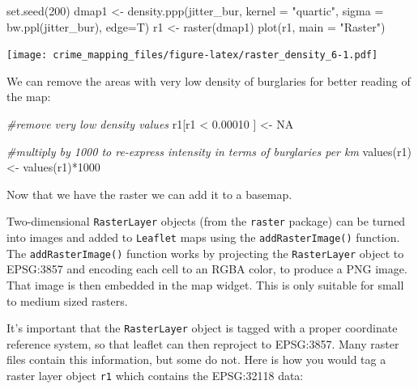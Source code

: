 \documentclass[
  krantz2]{krantz}
\makeatletter
\newenvironment{Shaded}{\begin{snugshade}}{\end{snugshade}}
\newcommand{\AttributeTok}[1]{\textcolor[rgb]{0.61,0.61,0.61}{#1}}
\newcommand{\CommentTok}[1]{\textcolor[rgb]{0.37,0.37,0.37}{\textit{#1}}}
\newcommand{\ConstantTok}[1]{\textcolor[rgb]{0,0,0}{#1}}
\newcommand{\DecValTok}[1]{\textcolor[rgb]{0.06,0.06,0.06}{#1}}
\newcommand{\FloatTok}[1]{\textcolor[rgb]{0.06,0.06,0.06}{#1}}
\newcommand{\FunctionTok}[1]{\textcolor[rgb]{0,0,0}{#1}}
\newcommand{\NormalTok}[1]{#1}
\newcommand{\OtherTok}[1]{\textcolor[rgb]{0.37,0.37,0.37}{#1}}
\newcommand{\SpecialCharTok}[1]{\textcolor[rgb]{0,0,0}{#1}}
\newcommand{\StringTok}[1]{\textcolor[rgb]{0.5,0.5,0.5}{#1}}
\newenvironment{kframe}{%
\medskip{}
\setlength{\fboxsep}{.8em}
 \def\at@end@of@kframe{}%
 \ifinner\ifhmode%
  \def\at@end@of@kframe{\end{minipage}}%
  \begin{minipage}{\columnwidth}%
 \fi\fi%
 \def\FrameCommand##1{\hskip\@totalleftmargin \hskip-\fboxsep
 \colorbox{shadecolor}{##1}\hskip-\fboxsep
     \hskip-\linewidth \hskip-\@totalleftmargin \hskip\columnwidth}%
 \MakeFramed {\advance\hsize-\width
   \@totalleftmargin\z@ \linewidth\hsize
   \@setminipage}}%
 {\par\unskip\endMakeFramed%
 \at@end@of@kframe}
\renewenvironment{Shaded}{\begin{kframe}}{\end{kframe}}
\makeatother
\begin{document}
\begin{Shaded}
\begin{Highlighting}[]
\FunctionTok{set.seed}\NormalTok{(}\DecValTok{200}\NormalTok{)}
\NormalTok{dmap1 }\OtherTok{\textless{}{-}} \FunctionTok{density.ppp}\NormalTok{(jitter\_bur, }\AttributeTok{kernel =} \StringTok{"quartic"}\NormalTok{,}
                     \AttributeTok{sigma =} \FunctionTok{bw.ppl}\NormalTok{(jitter\_bur), }
                     \AttributeTok{edge=}\NormalTok{T)}
\NormalTok{r1 }\OtherTok{\textless{}{-}} \FunctionTok{raster}\NormalTok{(dmap1)}
\FunctionTok{plot}\NormalTok{(r1, }\AttributeTok{main =} \StringTok{"Raster"}\NormalTok{)}
\end{Highlighting}
\end{Shaded}

\texttt{[image: crime\_mapping\_files/figure-latex/raster\_density\_6-1.pdf]}

We can remove the areas with very low density of burglaries for better reading of the map:

\begin{Shaded}
\begin{Highlighting}[]
\CommentTok{\#remove very low density values}
\NormalTok{r1[r1 }\SpecialCharTok{\textless{}} \FloatTok{0.00010}\NormalTok{ ] }\OtherTok{\textless{}{-}} \ConstantTok{NA}

\CommentTok{\#multiply by 1000 to re{-}express intensity in terms of burglaries per km}
\FunctionTok{values}\NormalTok{(r1) }\OtherTok{\textless{}{-}} \FunctionTok{values}\NormalTok{(r1)}\SpecialCharTok{*}\DecValTok{1000}
\end{Highlighting}
\end{Shaded}

Now that we have the raster we can add it to a basemap.

Two-dimensional \texttt{RasterLayer} objects (from the \texttt{raster} package) can be turned into images and added to \texttt{Leaflet} maps using the \texttt{addRasterImage()} function. The \texttt{addRasterImage()} function works by projecting the \texttt{RasterLayer} object to EPSG:3857 and encoding each cell to an RGBA color, to produce a PNG image. That image is then embedded in the map widget. This is only suitable for small to medium sized rasters.

It's important that the \texttt{RasterLayer} object is tagged with a proper coordinate reference system, so that leaflet can then reproject to EPSG:3857. Many raster files contain this information, but some do not. Here is how you would tag a raster layer object \texttt{r1} which contains the EPSG:32118 data:
\end{document}
